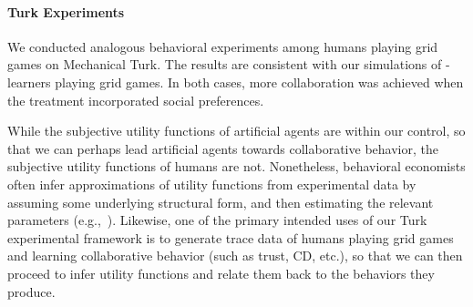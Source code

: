 
\vspace{\up}
\paragraph{Turk Experiments}
\label{sec:human}

We conducted analogous behavioral experiments among humans playing
grid games on Mechanical Turk.
%
%
The results are consistent with our simulations of \Q-learners playing
grid games.  In both cases, more collaboration was achieved when the
treatment incorporated social preferences.

While the subjective utility functions of artificial agents are within
our control, so that we can perhaps lead artificial agents towards
collaborative behavior, the subjective utility functions of humans are
not.  Nonetheless, behavioral economists often infer approximations of
utility functions from experimental data by assuming some underlying
structural form, and then estimating the relevant parameters
(e.g.,~\cite{RePEc:eee:ecochp:6a-64}).  Likewise, one of the primary
intended uses of our Turk experimental framework is to generate trace
data of humans playing grid games and learning collaborative behavior
(such as trust, CD, etc.), so that we can then proceed to infer
utility functions and relate them back to the behaviors they produce.

